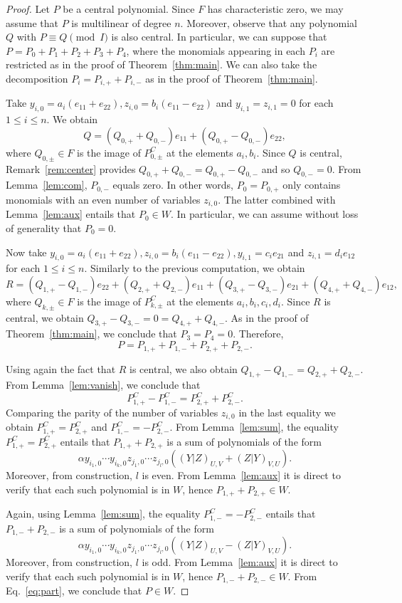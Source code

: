 \documentclass[11pt]{amsart}
\theoremstyle{definition}
\theoremstyle{remark}
\begin{document}
\begin{proof}
Let $P$ be a central polynomial. Since $F$ has characteristic zero, we may assume that $P$ is multilinear of degree $n$. Moreover, observe that any polynomial $Q$ with $P\equiv Q\pmod I$ is also central. In particular, we can suppose that $P=P_0+P_1+P_2+P_3+P_4$, where the monomials appearing in each $P_i$ are restricted as in the proof of Theorem~\ref{thm:main}. We can also take the decomposition $P_i=P_{i, +}+P_{i, -}$ as in the proof of Theorem~\ref{thm:main}.

 Take $y_{i, 0}=a_i(e_{11}+e_{22}), z_{i, 0}=b_i(e_{11}-e_{22})$ and $y_{i, 1}=z_{i, 1}=0$ for each $1\le i\le n$. We obtain
$$Q=(Q_{0, +}+Q_{0, -})e_{1 1}+(Q_{0, +}-Q_{0, -})e_{2 2},$$
where $Q_{0, \pm}\in F$ is the image of $P_{0, \pm}^C$ at the elements $a_i, b_i$. Since $Q$ is central, Remark~\ref{rem:center} provides $Q_{0, +}+Q_{0, -}=Q_{0, +}-Q_{0, -}$ and so $Q_{0, -}=0$. From Lemma~\ref{lem:com}, $P_{0, -}$ equals zero. In other words, $P_{0}=P_{0, +}$ only  contains monomials with an even number of variables $z_{i, 0}$. The latter combined with Lemma~\ref{lem:aux} entails that $P_0\in W$. In particular, we can assume without loss of generality that $P_0=0$. 

Now take $y_{i, 0}=a_i(e_{11}+e_{22}), z_{i, 0}=b_i(e_{11}-e_{22}), y_{i, 1}=c_ie_{21}$ and $z_{i, 1}=d_ie_{12}$ for each $1\le i\le n$.
Similarly to the previous computation, we obtain 
$$R=(Q_{1, +}-Q_{1, -})e_{22}+(Q_{2, +}+Q_{2, -})e_{11}+(Q_{3, +}-Q_{3, -})e_{21}+(Q_{4, +}+Q_{4, -}) e_{12},$$
where $Q_{k, \pm}\in F$ is the image of $P_{k, \pm}^C$ at the elements $a_i, b_i, c_i, d_i$. Since  $R$ is central, we obtain $Q_{3, +}-Q_{3, -}=0=Q_{4, +}+Q_{4, -}$. As in the proof of Theorem~\ref{thm:main}, we conclude that $P_3=P_4=0$. Therefore, 
\begin{equation}\label{eq:part}
    P=P_{1, +}+P_{1, -}+P_{2, +}+P_{2, -}.
\end{equation}

Using again the fact that $R$ is central, we also obtain $Q_{1, +}-Q_{1, -}=Q_{2, +}+Q_{2, -}$. From Lemma~\ref{lem:vanish}, we conclude that 
$$P_{1, +}^C-P_{1, -}^C=P_{2, +}^C+P_{2, -}^C.$$
Comparing the parity of the number of variables $z_{i, 0}$ in the last equality we obtain $P_{1, +}^C=P_{2, +}^C$ and $P_{1, -}^C=-P_{2, -}^C$. From Lemma~\ref{lem:sum}, the equality $P_{1, +}^C=P_{2, +}^C$ entails that $P_{1, +}+P_{2, +}$ is a sum of polynomials of the form 
$$\alpha y_{i_1, 0}\cdots y_{i_k, 0}z_{j_{1}, 0}\cdots z_{j_{l}, 0}((Y|Z)_{U, V}+(Z|Y)_{V, U}).$$
Moreover, from construction, $l$ is even. From Lemma~\ref{lem:aux} it is direct to verify that each such polynomial is in $W$, hence $P_{1, +}+P_{2, +}\in W$. 

Again, using Lemma~\ref{lem:sum}, the equality $P_{1, -}^C=-P_{2, -}^C$ entails that $P_{1, -}+P_{2, -}$ is a sum of polynomials of the form 
$$\alpha y_{i_1, 0}\cdots y_{i_k, 0}z_{j_{1}, 0}\cdots z_{j_{l}, 0}((Y|Z)_{U, V}-(Z|Y)_{V, U}).$$
Moreover, from construction, $l$ is odd. From Lemma~\ref{lem:aux} it is direct to verify that each such polynomial is in $W$, hence $P_{1, -}+P_{2, -}\in W$. From Eq.~\eqref{eq:part}, we conclude that $P\in W$.
\end{proof}
\end{document}
